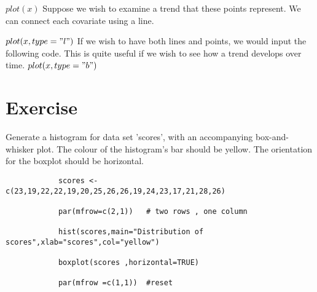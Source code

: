 			$plot(x)$
			Suppose we wish to examine a trend that these points represent. We can connect each covariate using a line.
			
			$plot(x, type = "l")$
			If we wish to have both lines and points, we would input the following code. This is quite useful if we wish to see how a trend develops over time.
			$plot(x, type = "b")$
			
			
			
			\section{Exercise}
			
			Generate a histogram for data set 'scores', with an accompanying box-and-whisker plot.
			The colour of the histogram's bar should be yellow. The orientation for the boxplot should be horizontal.
			
			\begin{verbatim}
			scores <-c(23,19,22,22,19,20,25,26,26,19,24,23,17,21,28,26)
			
			par(mfrow=c(2,1)) 	# two rows , one column
			
			hist(scores,main="Distribution of scores",xlab="scores",col="yellow")
			
			boxplot(scores ,horizontal=TRUE)
			
			par(mfrow =c(1,1)) 	#reset
			\end{verbatim}
